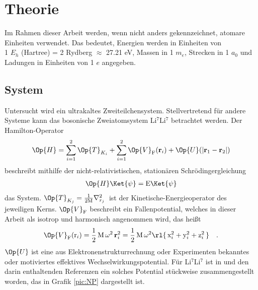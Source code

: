 \chapter{Theorie}
%
%
%
Im Rahmen dieser Arbeit werden, wenn nicht anders gekennzeichnet, atomare
Einheiten verwendet. Das bedeutet, Energien werden in Einheiten von \\ 1 $E_h$ 
(Hartree) =  2 Rydberg $\approx$ 27.21 eV, Massen in 1 $m_e$, Strecken in 1
$a_0$ und Ladungen in Einheiten von 1 $e$ angegeben.
%
%
%
\section{System}\label{sec:System}
%
Untersucht wird ein ultrakaltes Zweiteilchensystem.
Stellvertretend für andere Systeme kann das bosonische Zweiatomsystem 
Li$^7$Li$^7$ betrachtet werden. Der Hamilton-Operator 
%
\begin{align}\label{eq:kernHam1}
	\Op{H}=\sum_{i=1}^{2}\Op{T}_{K_i}
		+\sum_{i=1}^{2} \Op{V}_{\text{F}}(\textbf{r}_i)
		+\Op{U}(|\textbf{r}_1-\textbf{r}_2|) 
\end{align} 
% 
beschreibt mithilfe der nicht-relativistischen, stationären Schrödingergleichung
%
\begin{align}\label{eq:algSg1}
	\Op{H}\Ket{\psi} = \text{E} \Ket{\psi}
\end{align}
%
das System. 
$\Op{T}_{K_j}=\frac{1}{2\text{M}}\nabla^2_{r_j}$\
ist der 
Kinetische-Energieoperator des jeweiligen Kerns. $\Op{V}_\text{F}$ beschreibt 
ein
Fallenpotential, welches in dieser Arbeit als isotrop und harmonisch angenommen 
wird, das 
heißt 
%
\begin{align}
\Op{V}_\text{F}(\text{r}_i) = \frac{1}{2}\,\text{M}\,\omega^2\, 
\textbf{r}^2_i=\frac{1}{2}\,\text{M}\,\omega^2 \rl{ \, \text{x}^2_i + 
\text{y}^2_i + 
\text{z}^2_i\, } \quad.
\end{align}
$\Op{U}$  ist eine aus 
Elektronenstrukturrechnung oder Experimenten bekanntes oder motiviertes  
effektives Wechselwirkungspotential. Für Li$^7$Li$^7$ ist in 
\cite{phdthesis:sergey} und den darin enthaltenden Referenzen ein 
solches Potential stückweise zusammengestellt worden, das 
in Grafik 
\ref{pic:NP} dargestellt ist. \\
 
